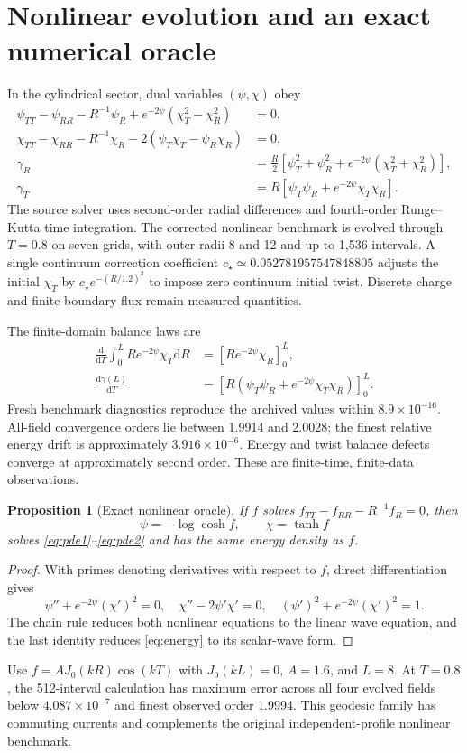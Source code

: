 \documentclass[11pt]{article}
\newtheorem{proposition}[theorem]{Proposition}
\newcommand{\dd}{\mathrm d}
\begin{document}
\section{Nonlinear evolution and an exact numerical oracle}
In the cylindrical sector, dual variables $(\psi,\chi)$ obey
\begin{align}
\psi_{TT}-\psi_{RR}-R^{-1}\psi_R
+e^{-2\psi}(\chi_T^2-\chi_R^2)&=0,\label{eq:pde1}\\
\chi_{TT}-\chi_{RR}-R^{-1}\chi_R
-2(\psi_T\chi_T-\psi_R\chi_R)&=0,\label{eq:pde2}\\
\gamma_R&=\frac R2\left[\psi_T^2+\psi_R^2
+e^{-2\psi}(\chi_T^2+\chi_R^2)\right],\label{eq:energy}\\
\gamma_T&=R\left[\psi_T\psi_R+e^{-2\psi}\chi_T\chi_R\right].
\end{align}
The source solver uses second-order radial differences and fourth-order Runge--Kutta time integration. The corrected nonlinear benchmark is evolved through $T=0.8$ on seven grids, with outer radii 8 and 12 and up to 1,536 intervals. A single continuum correction coefficient $c_\star\simeq0.052781957547848805$ adjusts the initial $\chi_T$ by $c_\star e^{-(R/1.2)^2}$ to impose zero continuum initial twist. Discrete charge and finite-boundary flux remain measured quantities.

The finite-domain balance laws are
\begin{align}
\frac{\dd}{\dd T}\int_0^L Re^{-2\psi}\chi_T\dd R
&=\left[Re^{-2\psi}\chi_R\right]_0^L,\\
\frac{\dd\gamma(L)}{\dd T}
&=\left[R(\psi_T\psi_R+e^{-2\psi}\chi_T\chi_R)\right]_0^L.
\end{align}
Fresh benchmark diagnostics reproduce the archived values within $8.9\times10^{-16}$. All-field convergence orders lie between 1.9914 and 2.0028; the finest relative energy drift is approximately $3.916\times10^{-6}$. Energy and twist balance defects converge at approximately second order. These are finite-time, finite-data observations.

\begin{proposition}[Exact nonlinear oracle]
If $f$ solves $f_{TT}-f_{RR}-R^{-1}f_R=0$, then
\begin{equation}\label{eq:oracle}
\boxed{\psi=-\log\cosh f,\qquad\chi=\tanh f}
\end{equation}
solves \eqref{eq:pde1}--\eqref{eq:pde2} and has the same energy density as $f$.
\end{proposition}
\begin{proof}
With primes denoting derivatives with respect to $f$, direct differentiation gives
\[
\psi''+e^{-2\psi}(\chi')^2=0,\quad
\chi''-2\psi'\chi'=0,\quad
(\psi')^2+e^{-2\psi}(\chi')^2=1.
\]
The chain rule reduces both nonlinear equations to the linear wave equation, and the last identity reduces \eqref{eq:energy} to its scalar-wave form.
\end{proof}
Use $f=A J_0(kR)\cos(kT)$ with $J_0(kL)=0$, $A=1.6$, and $L=8$. At $T=0.8$, the 512-interval calculation has maximum error across all four evolved fields below $4.087\times10^{-7}$ and finest observed order 1.9994. This geodesic family has commuting currents and complements the original independent-profile nonlinear benchmark.
\end{document}
